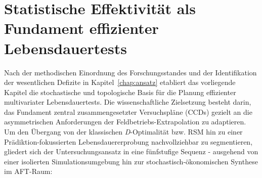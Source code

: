 
\chapter{Statistische Effektivität als Fundament effizienter Lebensdauertests} \label{chap:entwurf}

Nach der methodischen Einordnung des Forschungsstandes und der Identifikation der wesentlichen Defizite in Kapitel~\ref{chap:ansatz} etabliert das vorliegende Kapitel die stochastische und topologische Basis für die Planung effizienter multivariater Lebensdauertests.
Die wissenschaftliche Zielsetzung besteht darin, das Fundament zentral zusammengesetzter Versuchspläne (\acp{CCD}) gezielt an die asymmetrischen Anforderungen der Feldbetriebs-Extrapolation zu adaptieren.
Um den Übergang von der klassischen \textit{D}-Optimalität bzw. \ac{RSM} hin zu einer Prädiktion-fokussierten Lebensdauererprobung nachvollziehbar zu segmentieren, gliedert sich der Untersuchungsansatz in eine fünfstufige Sequenz - ausgehend von einer isolierten Simulationsumgebung hin zur stochastisch-ökonomischen Synthese im \ac{AFT}-Raum:

